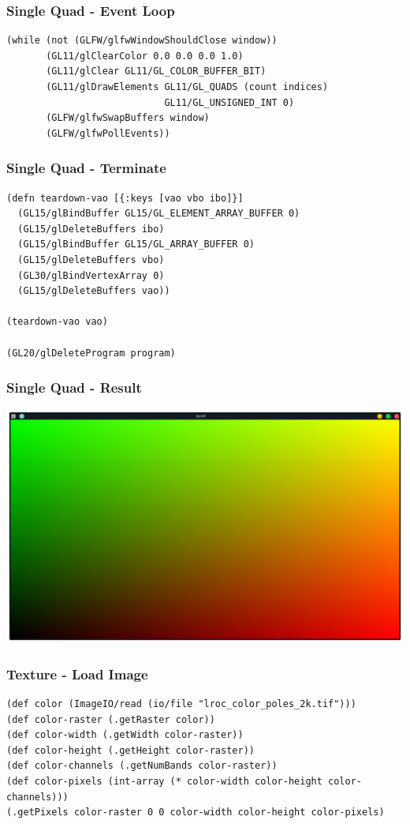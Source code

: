 \documentclass[aspectratio=169,11pt,xcolor=dvipsnames]{beamer}
\begin{document}
\begin{frame}[fragile]
  \frametitle{Single Quad {-} Event Loop}
  \begin{verbatim}
(while (not (GLFW/glfwWindowShouldClose window))
       (GL11/glClearColor 0.0 0.0 0.0 1.0)
       (GL11/glClear GL11/GL_COLOR_BUFFER_BIT)
       (GL11/glDrawElements GL11/GL_QUADS (count indices)
                            GL11/GL_UNSIGNED_INT 0)
       (GLFW/glfwSwapBuffers window)
       (GLFW/glfwPollEvents))
  \end{verbatim}
\end{frame}

\begin{frame}[fragile]
  \frametitle{Single Quad {-} Terminate}
  \begin{verbatim}
(defn teardown-vao [{:keys [vao vbo ibo]}]
  (GL15/glBindBuffer GL15/GL_ELEMENT_ARRAY_BUFFER 0)
  (GL15/glDeleteBuffers ibo)
  (GL15/glBindBuffer GL15/GL_ARRAY_BUFFER 0)
  (GL15/glDeleteBuffers vbo)
  (GL30/glBindVertexArray 0)
  (GL15/glDeleteBuffers vao))

(teardown-vao vao)

(GL20/glDeleteProgram program)
  \end{verbatim}
\end{frame}

\begin{frame}
  \frametitle{Single Quad {-} Result}
  \begin{center}
    \includegraphics[width=.8\textwidth]{quad}
  \end{center}
\end{frame}

\begin{frame}[fragile]
  \frametitle{Texture {-} Load Image}
  \begin{verbatim}
(def color (ImageIO/read (io/file "lroc_color_poles_2k.tif")))
(def color-raster (.getRaster color))
(def color-width (.getWidth color-raster))
(def color-height (.getHeight color-raster))
(def color-channels (.getNumBands color-raster))
(def color-pixels (int-array (* color-width color-height color-channels)))
(.getPixels color-raster 0 0 color-width color-height color-pixels)
  \end{verbatim}
\end{frame}
\end{document}
